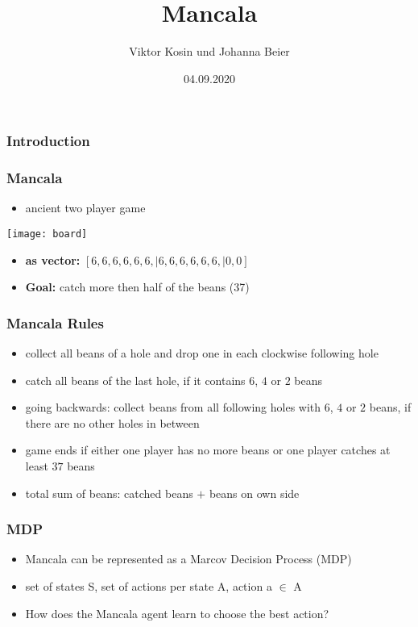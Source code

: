 \documentclass{beamer}
\title{Mancala}
\author{Viktor Kosin und Johanna Beier}
\date{04.09.2020}
\begin{document}
\frame{\titlepage}

\begin{frame}
\frametitle{Introduction}
\end{frame}

\begin{frame}
\frametitle{Mancala}
\begin{itemize}
\item ancient two player game
\end{itemize}
\texttt{[image: board]}
\end{frame}

\begin{frame}
\begin{itemize}
\item \textbf{as vector:} $[6,6,6,6,6,6, | 6,6,6,6,6,6, |0,0]$
\item\textbf{Goal:} catch more then half of the beans (37) 
\end{itemize}
\end{frame}

\begin{frame}
\frametitle{Mancala Rules}
\begin{itemize}
\item collect all beans of a hole and drop one in each clockwise following hole
\item catch all beans of the last hole, if it contains $6$, $4$ or $2$ beans
\item going backwards: collect beans from all following holes with $6$, $4$ or $2$ beans, if there are no other holes in between
\item game ends if either one player has no more beans or one player catches at least $37$ beans
\item total sum of beans: catched beans $+$ beans on own side
\end{itemize}
\end{frame}

\begin{frame}
 \frametitle{MDP}
 \begin{itemize}
 \item Mancala can be represented as a Marcov Decision Process (MDP)
 \item set of states S, set of actions per state A, action a $\in$ A
 \item How does the Mancala agent learn to choose the best action?
 \end{itemize}
 \end{frame}
\end{document}
